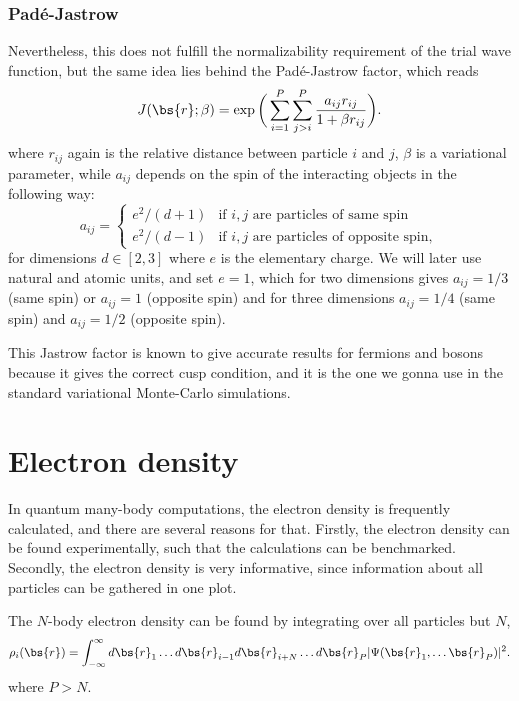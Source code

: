 \subsubsection{Padé-Jastrow}
Nevertheless, this does not fulfill the normalizability requirement of the trial wave function, but the same idea lies behind the Padé-Jastrow factor, which reads
\begin{equation}
J(\bs{r};\beta) = \exp\bigg(\sum_{i=1}^P\sum_{j>i}^P\frac{a_{ij}r_{ij}}{1+\beta r_{ij}}\bigg).
\label{eq:PadeJastrow}
\end{equation}
where $r_{ij}$ again is the relative distance between particle $i$ and $j$, $\beta$ is a variational parameter, while $a_{ij}$ depends on the spin of the interacting objects in the following way:
\begin{equation}
\label{eq:ajastrow}
a_{ij}=
\begin{cases} 
e^2/(d+1) & \text{if $i,j$ are particles of same spin} \\
e^2/(d-1) & \text{if $i,j$ are particles of opposite spin},
\end{cases}
\end{equation}
for dimensions $d\in[2,3]$ where $e$ is the elementary charge. We will later use natural and atomic units, and set $e=1$, which for two dimensions gives $a_{ij}=1/3$ (same spin) or $a_{ij}=1$ (opposite spin) and for three dimensions $a_{ij}=1/4$ (same spin) and $a_{ij}=1/2$ (opposite spin).

This Jastrow factor is known to give accurate results for fermions and bosons because it gives the correct cusp condition, and it is the one we gonna use in the standard variational Monte-Carlo simulations.

\section{Electron density}
In quantum many-body computations, the electron density is frequently calculated, and there are several reasons for that. Firstly, the electron density can be found experimentally, such that the calculations can be benchmarked. Secondly, the electron density is very informative, since information about all particles can be gathered in one plot.

The $N$-body electron density can be found by integrating over all particles but $N$, 
\begin{equation}
\label{eq:electron_density}
\rho_i(\bs{r})=\int_{-\infty}^{\infty}d\bs{r}_1\hdots d\bs{r}_{i-1}d\bs{r}_{i+N}\hdots d\bs{r}_P |\Psi(\bs{r}_1,\hdots \bs{r}_P)|^2.
\end{equation}
where $P>N$.

